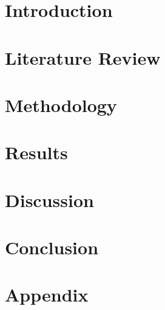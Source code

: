 \documentclass[12pt]{report}
\begin{document}




\chapter{Introduction}


\chapter{Literature Review}


\chapter{Methodology}


\chapter{Results}


\chapter{Discussion}


\chapter{Conclusion}


\appendix
\chapter{Appendix}


\printbibliography[title={References}]{}
\end{document}
